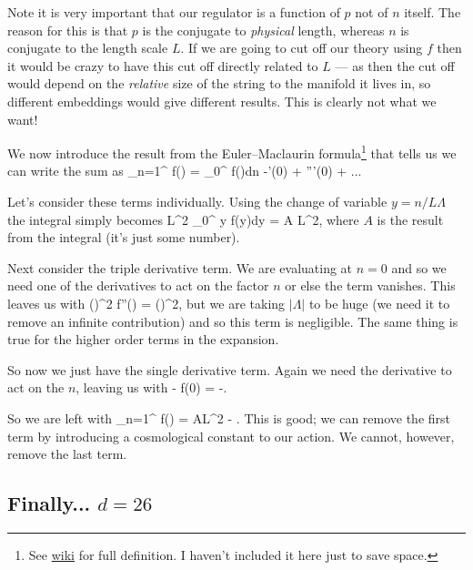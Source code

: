 \br 
    Note it is very important that our regulator is a function of $p$ not of $n$ itself. The reason for this is that $p$ is the conjugate to \textit{physical} length, whereas $n$ is conjugate to the length scale $L$. If we are going to cut off our theory using $f$ then it would be crazy to have this cut off directly related to $L$ --- as then the cut off would depend on the \textit{relative} size of the string to the manifold it lives in, so different embeddings would give different results. This is clearly not what we want!
\er 

We now introduce the result from the Euler–Maclaurin formula\footnote{See \href{https://en.wikipedia.org/wiki/Euler–Maclaurin_formula}{wiki} for full definition. I haven't included it here just to save space.} that tells us we can write the sum as
\bse 
    \sum_{n=1}^{\infty} f\bigg(\bigg) = \int_0^{\infty} f\bigg(\bigg)dn -'(0) +   '''(0) + ... 
\ese 

Let's consider these terms individually. Using the change of variable $y=n/L\Lambda$ the integral simply becomes 
\bse 
    L\Lambda^2 \int_0^{\infty} y f(y)dy = A L\Lambda^2,
\ese 
where $A$ is the result from the integral (it's just some number). 

Next consider the triple derivative term. We are evaluating at $n=0$ and so we need one of the derivatives to act on the factor $n$ or else the term vanishes. This leaves us with 
\bse 
      \bigg(\bigg)^2 f''\bigg(\bigg) =   \bigg(\bigg)^2,
\ese 
but we are taking $|\Lambda|$ to be huge (we need it to remove an infinite contribution) and so this term is negligible. The same thing is true for the higher order terms in the expansion.

So now we just have the single derivative term. Again we need the derivative to act on the $n$, leaving us with 
\bse 
    -  f(0) = -.
\ese 

So we are left with 
\bse 
    \sum_{n=1}^{\infty} f\bigg(\bigg) = AL\Lambda^2 - .
\ese 
This is good; we can remove the first term by introducing a cosmological constant to our action. We cannot, however, remove the last term. 

\subsection{Finally... $d=26$}

